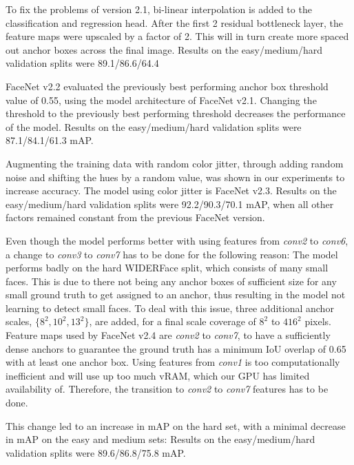 \documentclass[a4paper, twoside]{article}
\begin{document}
To fix the problems of version 2.1, bi-linear interpolation is added to the classification and regression head. After the first 2 residual bottleneck layer, the feature maps were upscaled by a factor of 2. This will in turn create more spaced out anchor boxes across the final image. Results on the easy/medium/hard validation splits were 89.1/86.6/64.4

FaceNet v2.2 evaluated the previously best performing anchor box threshold value of 0.55, using the model architecture of FaceNet v2.1. Changing the threshold to the previously best performing threshold decreases the performance of the model. Results on the easy/medium/hard validation splits were 87.1/84.1/61.3 mAP.

Augmenting the training data with random color jitter, through adding random noise and shifting the hues by a random value, was shown in our experiments to increase accuracy. The model using color jitter is FaceNet v2.3. Results on the easy/medium/hard validation splits were 92.2/90.3/70.1 mAP, when all other factors remained constant from the previous FaceNet version.

Even though the model performs better with using features from \textit{conv2} to \textit{conv6}, a change to \textit{conv3} to \textit{conv7} has to be done for the following reason: The model performs badly on the hard WIDERFace split, which consists of many small faces. This is due to there not being any anchor boxes of sufficient size for any small ground truth to get assigned to an anchor, thus resulting in the model not learning to detect small faces. To deal with this issue, three additional anchor scales, $\{8^2, 10^2, 13^2\}$, are added, for a final scale coverage of $8^2$ to $416^2$ pixels. Feature maps used by FaceNet v2.4 are \textit{conv2} to \textit{conv7}, to have a sufficiently dense anchors to guarantee the ground truth has a minimum IoU overlap of 0.65 with at least one anchor box. Using features from \textit{conv1} is too computationally inefficient and will use up too much vRAM, which our GPU has limited availability of. Therefore, the transition to \textit{conv2} to \textit{conv7} features has to be done.

This change led to an increase in mAP on the hard set, with a minimal decrease in mAP on the easy and medium sets: Results on the easy/medium/hard validation splits were 89.6/86.8/75.8 mAP.
\end{document}
